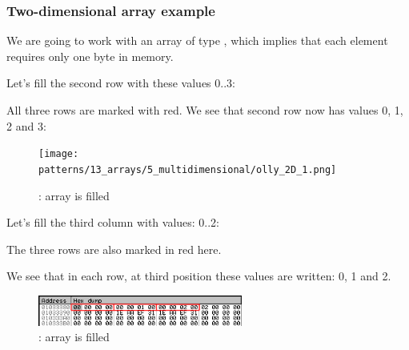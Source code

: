 \subsubsection{Two-dimensional array example}

We are going to work with an array of type \Tchar, which implies that each element requires only one 
byte in memory.

\myindex{\olly}

Let's fill the second row with these values 0..3:



All three rows are marked with red. 
We see that second row now has values 0, 1, 2 and 3:

\begin{figure}[H]
\centering
\texttt{[image: patterns/13\_arrays/5\_multidimensional/olly\_2D\_1.png]}
\caption{\olly: array is filled}
\end{figure}

\myindex{\olly}

Let's fill the third column with values: 0..2:



The three rows are also marked in red here. 

We see that in each row, at third position these values are written: 0, 1 and 2.

\begin{figure}[H]
\centering
\includegraphics[width=0.6\textwidth]{patterns/13_arrays/5_multidimensional/olly_2D_2.png}
\caption{\olly: array is filled}
\end{figure}

